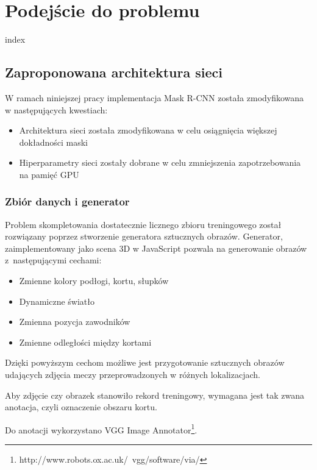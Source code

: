 \chapter{Podejście do problemu}

{index}

\section{Zaproponowana architektura sieci}
\label{sec:zaproponowana_architektura}

W ramach niniejszej pracy implementacja Mask R-CNN została zmodyfikowana w następujących kwestiach:

\begin{itemize}
	\item Architektura sieci została zmodyfikowana w celu osiągnięcia większej dokładności maski
	\item Hiperparametry sieci zostały dobrane w celu zmniejszenia zapotrzebowania na pamięć GPU
\end{itemize}


\subsection{Zbiór danych i generator}
\label{sec:generator}

Problem skompletowania dostatecznie licznego zbioru treningowego został rozwiązany poprzez stworzenie generatora sztucznych obrazów.
Generator, zaimplementowany jako scena 3D w JavaScript pozwala na generowanie obrazów z~następującymi cechami:

\begin{itemize}
	\item Zmienne kolory podłogi, kortu, słupków
	\item Dynamiczne światło
	\item Zmienna pozycja zawodników
	\item Zmienne odległości między kortami
\end{itemize}

Dzięki powyższym cechom możliwe jest przygotowanie sztucznych obrazów udających zdjęcia meczy przeprowadzonych w różnych lokalizacjach.

Aby zdjęcie czy obrazek stanowiło rekord treningowy, wymagana jest tak zwana anotacja, czyli oznaczenie obszaru kortu.

Do anotacji wykorzystano VGG Image Annotator\footnote{http://www.robots.ox.ac.uk/~vgg/software/via/}.
\\

